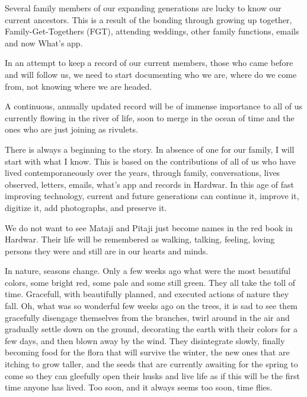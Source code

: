 Several family members of our expanding generations are lucky to know our current ancestors. This is a result of the bonding through growing up together, Family-Get-Togethers (FGT), attending weddings, other family functions, emails and now What’s app. 

In an attempt to keep a record of our current members, those who came before and will follow us, we need to start documenting who we are, where do we come from, not knowing where we are headed. 

A continuous, annually updated record will be of immense importance to all of us currently flowing in the river of life, soon to merge in the ocean of time and the ones who are just joining as rivulets. 

There is always a beginning to the story. In absence of one for our family, I will start with what I know. This is based on the contributions of all of us who have lived contemporaneously over the years, through family, conversations, lives observed, letters, emails, what’s app and records in Hardwar. In this age of fast improving technology, current and future generations can continue it, improve it, digitize it, add photographs, and preserve it. 

We do not want to see Mataji and Pitaji just become names in the red book in Hardwar. Their life will be remembered as walking, talking, feeling, loving persons they were and still are in our hearts and minds. 

In nature, seasons change. Only a few weeks ago what were the most beautiful colors, some bright red, some pale and some still green. They all take the toll of time. Gracefull, with beautifully planned, and executed actions of nature they fall. Oh, what was so wonderful few weeks ago on the trees, it is sad to see them gracefully disengage themselves from the branches, twirl around in the air and gradually settle down on the ground, decorating the earth with their colors for a few days, and then blown away by the wind. They disintegrate slowly, finally becoming food for the flora that will survive the winter, the new ones that are itching to grow taller, and the seeds that are currently awaiting for the spring to come so they can gleefully open their husks and live life as if this will be the first time anyone has lived. Too soon, and it always seems too soon, time flies. 

